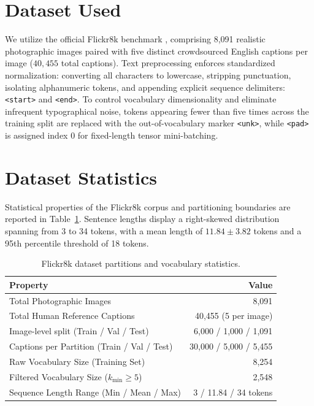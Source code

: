 \documentclass[10pt,conference,a4paper]{IEEEtran}
\begin{document}
\section{Dataset Used}
We utilize the official Flickr8k benchmark \cite{hodosh2013framing}, comprising 8,091 realistic photographic images paired with five distinct crowdsourced English captions per image ($40{,}455$ total captions). Text preprocessing enforces standardized normalization: converting all characters to lowercase, stripping punctuation, isolating alphanumeric tokens, and appending explicit sequence delimiters: \texttt{<start>} and \texttt{<end>}. To control vocabulary dimensionality and eliminate infrequent typographical noise, tokens appearing fewer than five times across the training split are replaced with the out-of-vocabulary marker \texttt{<unk>}, while \texttt{<pad>} is assigned index 0 for fixed-length tensor mini-batching.

\section{Dataset Statistics}
Statistical properties of the Flickr8k corpus and partitioning boundaries are reported in Table~\ref{tab:dataset_stats}. Sentence lengths display a right-skewed distribution spanning from 3 to 34 tokens, with a mean length of $11.84 \pm 3.82$ tokens and a 95th percentile threshold of 18 tokens.

\begin{table}[htbp]
\centering
\caption{Flickr8k dataset partitions and vocabulary statistics.}
\label{tab:dataset_stats}
\begin{tabular}{lr}
\toprule
\textbf{Property} & \textbf{Value} \\
\midrule
Total Photographic Images & 8,091 \\
Total Human Reference Captions & 40,455 (5 per image) \\
Image-level split (Train / Val / Test) & 6,000 / 1,000 / 1,091 \\
Captions per Partition (Train / Val / Test) & 30,000 / 5,000 / 5,455 \\
Raw Vocabulary Size (Training Set) & 8,254 \\
Filtered Vocabulary Size ($k_{\text{min}} \ge 5$) & 2,548 \\
Sequence Length Range (Min / Mean / Max) & 3 / 11.84 / 34 tokens \\
\bottomrule
\end{tabular}
\end{table}
\end{document}
